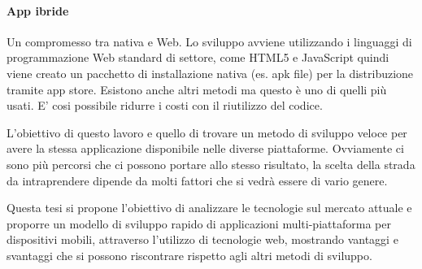 \documentclass[11pt, oneside]{Thesis} %
\begin{document}
{\paragraph*{App ibride} Un compromesso tra nativa e Web. Lo sviluppo avviene utilizzando i linguaggi di programmazione Web standard di settore, come HTML5 e JavaScript quindi viene creato un pacchetto di installazione nativa (es. apk file) per la distribuzione tramite app store. Esistono anche altri metodi ma questo è uno di quelli più usati. E' cosi possibile ridurre i costi con il riutilizzo del codice.

L'obiettivo di questo lavoro e quello di trovare un metodo di sviluppo veloce per avere la stessa applicazione disponibile nelle diverse piattaforme. Ovviamente ci sono più percorsi che ci possono portare allo stesso risultato, la scelta della strada da intraprendere dipende da molti fattori che si vedrà essere di vario genere.

Questa tesi si propone l'obiettivo di analizzare le tecnologie sul mercato attuale e proporre un modello di sviluppo rapido di applicazioni multi-piattaforma per dispositivi mobili, attraverso l'utilizzo di tecnologie web, mostrando vantaggi e svantaggi che si possono riscontrare rispetto agli altri metodi di sviluppo.

}

\clearpage %


\clearpage %
\end{document}

